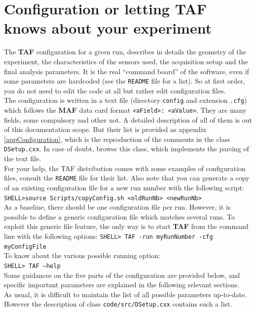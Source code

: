 \documentclass[a4paper, 12pt, twoside]{article}
\newcommand{\TAF}{{\bf TAF }}
\newcommand{\MAF}{{\bf MAF }}
\begin{document}
\vspace{2cm}

\section{Configuration or letting TAF knows about your experiment}
\label{secConfig}

The \TAF  configuration for a given run, describes in details the geometry of the experiment, the characteristics of the sensors used, the acquisition setup and the final analysis parameters. It is the real ``command board'' of the software, even if some parameters are hardcoded (see the {\tt README} file for a list). So at first order, you do not need to edit the code at all but rather edit configuration files.\\

\noindent
The configuration is written in a text file (directory {\tt config} and extension {\tt .cfg}) which follows the \MAF  data card format {\tt <aField>: <aValue>}. They are many fields, some compulsory and other not. A detailed description of all of them is out of this documentation scope. But their list is provided as appendix \ref{appConfiguration}, which is the reproduction of the comments in the class {\tt DSetup.cxx}. In case of doubt, browse this class, which implements the parsing of the text file.\\

\noindent
For your help, the TAF distribution comes with some examples of configuration files, consult the {\tt README} file for their list. Also note that you can generate a copy of an existing configuration file for a new run number with the following script:\\
{\tt SHELL>source Scripts/copyConfig.sh <oldRunNb> <newRunNb>}\\

\noindent
As a baseline, there should be one configuration file per run. However, it is possible to define a generic configuration file which matches several runs. To exploit this generic file feature, the only way is to start \TAF from the command line with the following options:
{\tt SHELL> TAF  -run myRunNumber -cfg myConfigFile}\\

\noindent
To know about the various possible running option:\\
{\tt SHELL> TAF --help}\\

\noindent
Some guidances on the five parts of the configuration are provided below, and specific important parameters are explained in the following relevant sections.\\
As usual, it is difficult to maintain the list of all possible parameters up-to-date. However the description of class {\tt code/src/DSetup.cxx} contains such a list.
\end{document}
